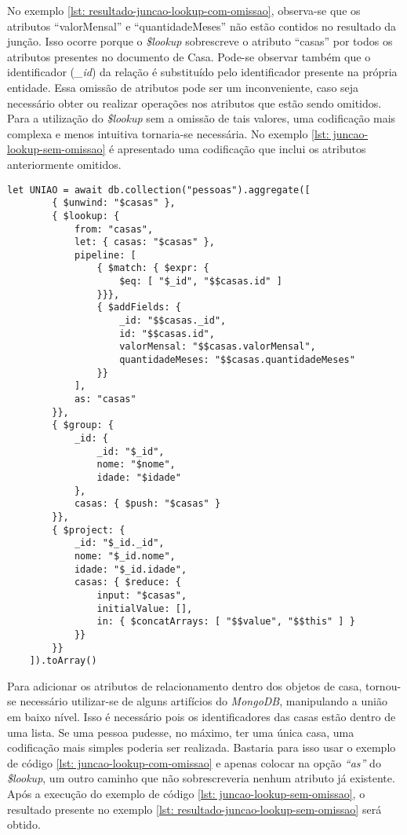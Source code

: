 No exemplo \ref{lst: resultado-juncao-lookup-com-omissao}, observa-se que os atributos ``valorMensal'' e ``quantidadeMeses'' não estão contidos no resultado da junção. Isso ocorre porque o \textit{\$lookup} sobrescreve o atributo ``casas'' por todos os atributos presentes no documento de Casa. Pode-se observar também que o identificador (\textit{\_id}) da relação é substituído pelo identificador presente na própria entidade. Essa omissão de atributos pode ser um inconveniente, caso seja necessário obter ou realizar operações nos atributos que estão sendo omitidos. Para a utilização do \textit{\$lookup} sem a omissão de tais valores, uma codificação mais complexa e menos intuitiva tornaria-se necessária. No exemplo \ref{lst: juncao-lookup-sem-omissao} é apresentado uma codificação que inclui os atributos anteriormente omitidos.

\begin{lstlisting}[style=ES6, caption={Junção de Documentos sem Omissão\label{lst: juncao-lookup-sem-omissao}}]
    let UNIAO = await db.collection("pessoas").aggregate([
        { $unwind: "$casas" },
        { $lookup: {
            from: "casas",
            let: { casas: "$casas" },
            pipeline: [
                { $match: { $expr: {
                    $eq: [ "$_id", "$$casas.id" ]
                }}},
                { $addFields: {
                    _id: "$$casas._id",
                    id: "$$casas.id",
                    valorMensal: "$$casas.valorMensal",
                    quantidadeMeses: "$$casas.quantidadeMeses"
                }}
            ],
            as: "casas"
        }},
        { $group: {
            _id: {
                _id: "$_id",
                nome: "$nome",
                idade: "$idade"
            },
            casas: { $push: "$casas" }
        }},
        { $project: {
            _id: "$_id._id",
            nome: "$_id.nome",
            idade: "$_id.idade",
            casas: { $reduce: {
                input: "$casas",
                initialValue: [],
                in: { $concatArrays: [ "$$value", "$$this" ] }
            }}
        }}
    ]).toArray()
\end{lstlisting}

Para adicionar os atributos de relacionamento dentro dos objetos de casa, tornou-se necessário utilizar-se de alguns artifícios do \textit{MongoDB}, manipulando a união em baixo nível. Isso é necessário pois os identificadores das casas estão dentro de uma lista. Se uma pessoa pudesse, no máximo, ter uma única casa, uma codificação mais simples poderia ser realizada. Bastaria para isso usar o exemplo de código \ref{lst: juncao-lookup-com-omissao} e apenas colocar na opção \textit{``as''} do \textit{\$lookup}, um outro caminho que não sobrescreveria nenhum atributo já existente. Após a execução do exemplo de código \ref{lst: juncao-lookup-sem-omissao}, o resultado presente no exemplo \ref{lst: resultado-juncao-lookup-sem-omissao} será obtido.


